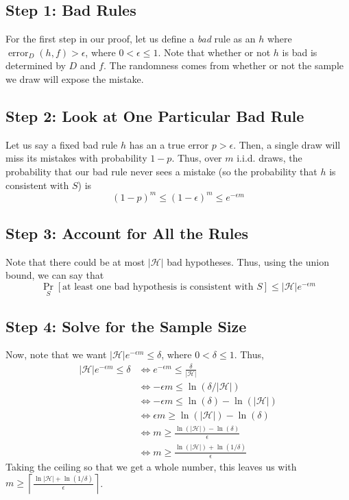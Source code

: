 \documentclass[11pt,fleqn]{article}
\newcommand{\Hy}{\mathcal H}
\newcommand{\err}{\operatorname{error}}
\newcommand{\eps}{\epsilon}
\begin{document}
\subsection*{Step 1: Bad Rules}

For the first step in our proof, let us define a \textit{bad} rule as an $h$ where $\err_D(h, f) > \epsilon$, where $0 < \eps \leq 1$. Note that whether or not $h$ is bad is determined by $D$ and $f$. The randomness comes from whether or not the sample we draw will expose the mistake.

\subsection*{Step 2: Look at One Particular Bad Rule}

Let us say a fixed bad rule $h$ has an a true error $p > \epsilon$. Then, a single draw will miss its mistakes with probability $1 - p$. Thus, over $m$ i.i.d. draws, the probability that our bad rule never sees a mistake (so the probability that $h$ is consistent with $S$) is
\[(1 - p)^m \leq (1 - \eps)^m \leq e^{-\eps m}\]

\subsection*{Step 3: Account for All the Rules}

Note that there could be at most $|\Hy|$ bad hypotheses. Thus, using the union bound, we can say that
\[\boxed{\Pr_S [\text{at least one bad hypothesis is consistent with } S] \leq |\Hy|e^{-\eps m}}\]

\subsection*{Step 4: Solve for the Sample Size}

Now, note that we want $|\Hy|e^{-\eps m} \leq \delta$, where $0 < \delta \leq 1$. Thus,
\begin{align*}
    |\Hy|e^{-\eps m} \leq \delta &\iff e^{-\eps m} \leq \frac{\delta}{|\Hy|}\\
    &\iff -\eps m \leq \ln (\delta / |\Hy|)\\
    &\iff -\eps m \leq \ln (\delta) - \ln(|\Hy|)\\
    &\iff \eps m \geq \ln(|\Hy|) - \ln (\delta) \\
    &\iff m \geq \frac{\ln(|\Hy|) - \ln (\delta)}{\eps}\\
    &\iff m \geq \frac{\ln(|\Hy|) + \ln (1/\delta)}{\eps}
\end{align*}
Taking the ceiling so that we get a whole number, this leaves us with $\boxed{m \geq \left\lceil \frac{\ln |\Hy| + \ln(1/\delta)}{\epsilon} \right\rceil}$.
\end{document}
